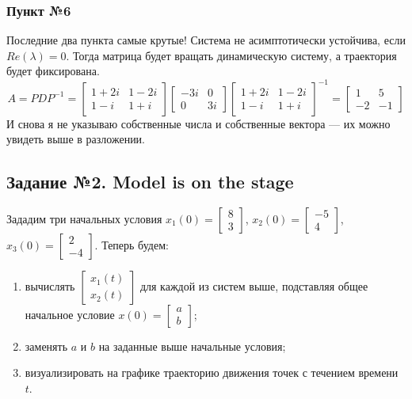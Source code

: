 \documentclass[a3paper,14pt]{extarticle}
\begin{document}
\subsubsection*{Пункт №6}
Последние два пункта самые крутые! Система не асимптотически устойчива, если $Re(\lambda) = 0$. Тогда матрица будет вращать динамическую систему, а траектория будет фиксирована.
$$A = PDP^{-1} = \begin{bmatrix}
    1+2i & 1-2i \\ 1-i & 1+i
\end{bmatrix}\begin{bmatrix}
    -3i & 0 \\ 0 & 3i
\end{bmatrix}\begin{bmatrix}
    1+2i & 1-2i \\ 1-i & 1+i
\end{bmatrix}^{-1} = \begin{bmatrix}
    1 & 5 \\ -2 & -1
\end{bmatrix}$$
И снова я не указываю собственные числа и собственные вектора --- их можно увидеть выше в разложении.\\[1em]
\subsection*{\centering Задание №2. Model is on the stage}
Зададим три начальных условия $x_1(0) = \left[\begin{smallmatrix}
    8 \\ 3
\end{smallmatrix}\right]$, $x_2(0) = \left[\begin{smallmatrix}
    -5 \\ 4
\end{smallmatrix}\right]$, $x_3(0) = \left[\begin{smallmatrix}
    2 \\ -4
\end{smallmatrix}\right]$. Теперь будем:\begin{enumerate}
    \item вычислять $\left[\begin{smallmatrix}
        x_1(t) \\ x_2(t)
    \end{smallmatrix}\right]$ для каждой из систем выше, подставляя общее начальное условие $x(0) = \left[\begin{smallmatrix}
        a \\ b
    \end{smallmatrix}\right]$;
    \item заменять $a$ и $b$ на заданные выше начальные условия;
    \item визуализировать на графике траекторию движения точек с течением времени $t$.
\end{enumerate}
\end{document}
